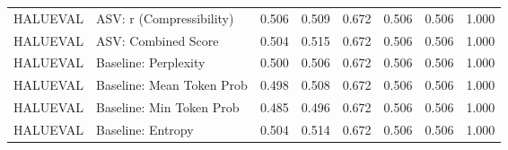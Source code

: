 \begin{table}[htbp]
\begin{tabular}{llrrrrrr}
HALUEVAL & ASV: r (Compressibility) & 0.506 & 0.509 & 0.672 & 0.506 & 0.506 & 1.000 \\
HALUEVAL & ASV: Combined Score & 0.504 & 0.515 & 0.672 & 0.506 & 0.506 & 1.000 \\
HALUEVAL & Baseline: Perplexity & 0.500 & 0.506 & 0.672 & 0.506 & 0.506 & 1.000 \\
HALUEVAL & Baseline: Mean Token Prob & 0.498 & 0.508 & 0.672 & 0.506 & 0.506 & 1.000 \\
HALUEVAL & Baseline: Min Token Prob & 0.485 & 0.496 & 0.672 & 0.506 & 0.506 & 1.000 \\
HALUEVAL & Baseline: Entropy & 0.504 & 0.514 & 0.672 & 0.506 & 0.506 & 1.000 \\
\midrule
\bottomrule
\end{tabular}
\end{table}
